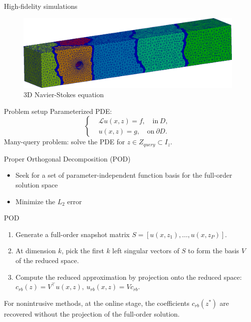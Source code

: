 \documentclass[10pt]{beamer}
\begin{document}
\begin{frame}{High-fidelity simulations}
\begin{figure}
\begin{minipage}[t]{0.32\textwidth}
    \includegraphics[width=\textwidth]{figures/Dfg3D_DD_2.png}
    \footnotemark[1]
    \caption{3D Navier-Stokes equation}
  \end{minipage}
\end{figure}
\end{frame}


\begin{frame}{Problem setup}
Parameterized PDE:
$$
\left\{
\begin{aligned}
&\mathcal{L}u(x, z) = f, \quad \text{in}\ D, \\ 
&u(x, z) = g, \quad \text{on}\ \partial D.
\end{aligned}
\right.
$$
Many-query problem: solve the PDE for $z \in Z_{query} \subset I_{z} $.

\end{frame}

\begin{frame}{Proper Orthogonal Decomposition (POD)}
\begin{itemize}
  \item Seek for a set of parameter-independent function basis for the full-order solution space
  \item Minimize the $L_2 $ error
\end{itemize}

\begin{block}{POD}
\begin{enumerate}
\item Generate a full-order snapshot matrix $S = [u(x, z_1), \hdots, u(x, z_P)].$
\item At dimension $k$, pick the first $k$ left singular vectors of $S$ to form the basis $V$ of the reduced space.
\item Compute the reduced approximation by projection onto the reduced space: $c_{rb}(z) = V^\top u(x, z), \ u_{rb}(x, z) = Vc_{rb} $.
\end{enumerate}
\end{block}
For nonintrusive methods, at the online stage, the coefficients $c_{rb}(z^*) $ are recovered without the projection of the full-order solution.


\end{frame}
\end{document}
